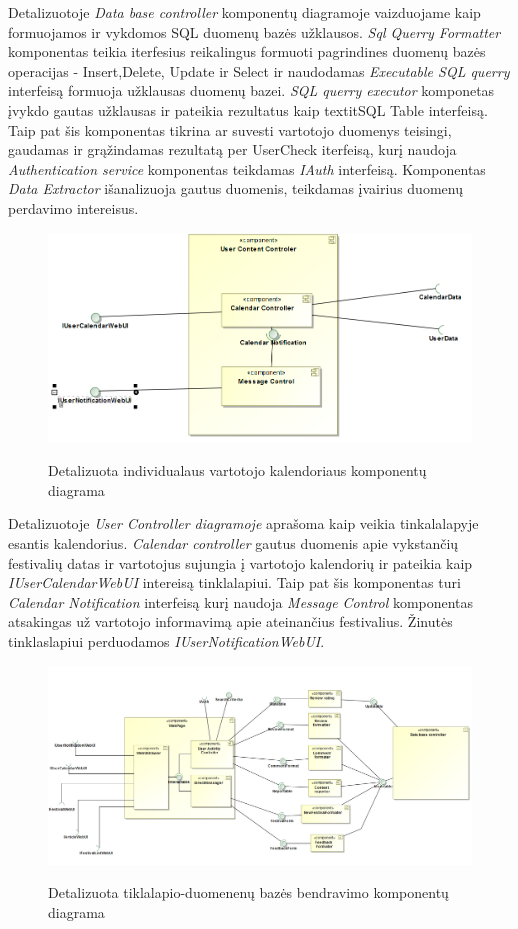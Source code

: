 ﻿\documentclass{VUMIFPSkursinis}
\begin{document}
Detalizuotoje \textit{Data base controller} komponentų diagramoje vaizduojame kaip formuojamos ir vykdomos SQL duomenų 
bazės užklausos. \textit{Sql Querry Formatter} komponentas teikia iterfesius reikalingus formuoti pagrindines duomenų bazės 
operacijas - Insert,Delete, Update ir Select ir naudodamas \textit{Executable SQL querry} interfeisą formuoja užklausas 
duomenų bazei. \textit{SQL querry executor} komponetas įvykdo gautas užklausas ir pateikia rezultatus kaip textit{SQL Table
}interfeisą. Taip pat šis komponentas tikrina ar suvesti vartotojo duomenys teisingi, gaudamas ir grąžindamas rezultatą per
{UserCheck} iterfeisą, kurį naudoja \textit{Authentication service} komponentas teikdamas \textit{IAuth} interfeisą. Komponentas
\textit{Data Extractor} išanalizuoja gautus duomenis, teikdamas įvairius duomenų perdavimo intereisus.

\begin{figure}[H]
\centering
    \includegraphics[scale=0.5]{img/PSI3/UserContentController.PNG}
	\label{mantas:5}
	\caption{Detalizuota individualaus vartotojo kalendoriaus komponentų diagrama}
\end{figure}

Detalizuotoje \textit{User Controller diagramoje} aprašoma kaip veikia tinkalalapyje esantis kalendorius. \textit{Calendar 
controller} gautus duomenis apie vykstančių festivalių datas ir vartotojus sujungia į vartotojo kalendorių ir pateikia kaip
\textit{IUserCalendarWebUI} intereisą tinklalapiui. Taip pat šis komponentas turi \textit{Calendar Notification} interfeisą 
kurį naudoja \textit{Message Control} komponentas atsakingas už vartotojo informavimą apie ateinančius festivalius. Žinutės 
tinklaslapiui perduodamos \textit{IUserNotificationWebUI}.


 \begin{figure}[H]
\centering
    \includegraphics[scale=0.45]{img/PSI3/WebPage.PNG}
	\label{mantas:3}
	\caption{Detalizuota tiklalapio-duomenenų bazės bendravimo komponentų diagrama}
\end{figure}
\end{document}
